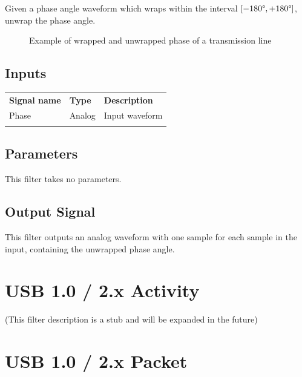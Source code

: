 Given a phase angle waveform which wraps within the interval $[-180\degree, +180 \degree]$, unwrap the phase angle.

\begin{figure}[h]
\centering
{}
\caption{Example of wrapped and unwrapped phase of a transmission line}
\label{unwrapped_phase_example}
\end{figure}

\subsection{Inputs}

\begin{tabularx}{16cm}{llX}
\thickhline
\textbf{Signal name} & \textbf{Type} & \textbf{Description} \\
\thickhline
Phase & Analog & Input waveform \\
\thickhline
\end{tabularx}

\subsection{Parameters}

This filter takes no parameters.

\subsection{Output Signal}

This filter outputs an analog waveform with one sample for each sample in the input, containing the unwrapped phase
angle.

\pagebreak
\section{USB 1.0 / 2.x Activity}

(This filter description is a stub and will be expanded in the future)

\pagebreak
\section{USB 1.0 / 2.x Packet}

